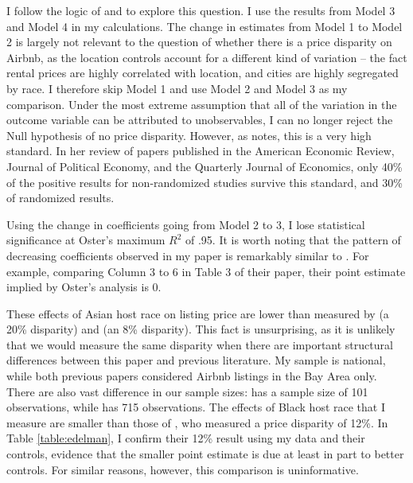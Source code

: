 I follow the logic of \cite{oster} and \cite{altonji} to explore this question. I use the results from Model 3 and Model 4 in my calculations. The change in estimates from Model 1 to Model 2 is largely not relevant to the question of whether there is a price disparity on Airbnb, as the location controls account for a different kind of variation -- the fact rental prices are highly correlated with location, and cities are highly segregated by race. I therefore skip Model 1 and use Model 2 and Model 3 as my comparison. Under the most extreme assumption that all of the variation in the outcome variable can be attributed to unobservables, I can no longer reject the Null hypothesis of no price disparity. However, as \cite{oster} notes, this is a very high standard. In her review of papers published in the American Economic Review, Journal of Political Economy, and the Quarterly Journal of Economics, only 40\% of the positive results for non-randomized studies survive this standard, and 30\% of randomized results. 

Using the change in coefficients going from Model 2 to 3, I lose statistical significance at Oster’s maximum $R^2$ of .95. It is worth noting that the pattern of decreasing coefficients observed in my paper is remarkably similar to \cite{kakar}. For example, comparing Column 3 to 6 in Table 3 of their paper, their point estimate implied by Oster's analysis is 0. 


These effects of Asian host race on listing price are lower than measured by \cite{wang} (a 20\% disparity) and \cite{kakar} (an 8\% disparity). This fact is unsurprising, as it is unlikely that we would measure the same disparity when there are important structural differences between this paper and previous literature. My sample is national, while both previous papers considered Airbnb listings in the Bay Area only. There are also vast difference in our sample sizes: \cite{wang} has a sample size of 101 observations, while \cite{kakar} has 715 observations. The effects of Black host race that I measure are smaller than those of \cite{edelman}, who measured a price disparity of 12\%. In Table \ref{table:edelman}, I confirm their 12\% result using my data and their controls, evidence that the smaller point estimate is due at least in part to better controls. For similar reasons, however, this comparison is uninformative.



